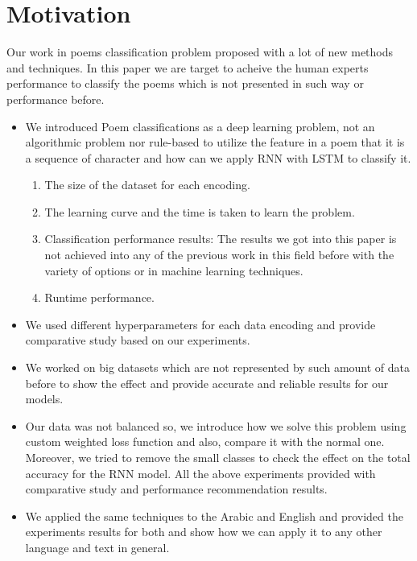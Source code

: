 \section{Motivation}
Our work in poems classification problem proposed with a lot of new methods and techniques. In this paper we are target to acheive the human experts performance to classify the poems which is not presented in such way or  performance before. 
\begin{itemize}
\item  We introduced Poem classifications as a deep learning problem, not an algorithmic problem nor rule-based to utilize the feature in a poem that it is a sequence of character and how can we apply RNN with LSTM to classify it.
  \begin{enumerate}
    \item The size of the dataset for each encoding.
    \item The learning curve and the time is taken to learn the problem.
    \item Classification performance results: The results we got into this paper is not achieved into any of the previous work in this field before with the variety of options or in machine learning techniques.

    \item Runtime performance.
  \end{enumerate}

\item We used different hyperparameters for each data encoding and provide comparative study based on our experiments.
\item We worked on big datasets which are not represented by such amount of data before to show the effect and provide accurate and reliable results for our models.
\item Our data was not balanced so, we introduce how we solve this problem using custom weighted loss function and also, compare it with the normal one. Moreover, we tried to remove the small classes to check the effect on the total accuracy for the RNN model. All the above experiments provided with comparative study and performance recommendation results.
\item We applied the same techniques to the Arabic and English and provided the experiments results for both and show how we can apply it to any other language and text in general.
  
\end{itemize}

